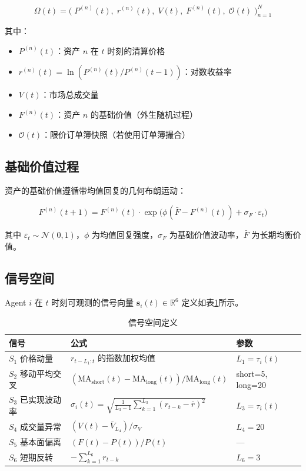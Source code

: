 \begin{equation}
\boxed{\Omega(t) = \bigl( \; P^{(n)}(t),\; r^{(n)}(t),\; V(t),\; F^{(n)}(t),\; \mathcal{O}(t) \;\bigr)_{n=1}^{N}}
\label{eq:market_state}
\end{equation}

其中：
\begin{itemize}
    \item $P^{(n)}(t)$：资产 $n$ 在 $t$ 时刻的清算价格
    \item $r^{(n)}(t) = \ln(P^{(n)}(t)/P^{(n)}(t-1))$：对数收益率
    \item $V(t)$：市场总成交量
    \item $F^{(n)}(t)$：资产 $n$ 的基础价值（外生随机过程）
    \item $\mathcal{O}(t)$：限价订单簿快照（若使用订单簿撮合）
\end{itemize}

\subsection{基础价值过程}

资产的基础价值遵循带均值回复的几何布朗运动：

\begin{equation}
F^{(n)}(t+1) = F^{(n)}(t) \cdot \exp\bigl( \phi(\bar{F} - F^{(n)}(t)) + \sigma_F \cdot \varepsilon_t \bigr)
\label{eq:fundamental}
\end{equation}

其中 $\varepsilon_t \sim \mathcal{N}(0, 1)$，$\phi$ 为均值回复强度，$\sigma_F$ 为基础价值波动率，$\bar{F}$ 为长期均衡价值。

\subsection{信号空间}
\label{sec:signal_space}

Agent $i$ 在 $t$ 时刻可观测的信号向量 $\mathbf{s}_i(t) \in \mathbb{R}^6$ 定义如表\ref{tab:signals}所示。

\begin{table}[htb]
\centering
\caption{信号空间定义}
\label{tab:signals}
\begin{tabular}{@{}lll@{}}
\toprule
信号 & 公式 & 参数 \\
\midrule
$S_1$ 价格动量 & $r_{t-L_1:t}$ 的指数加权均值 & $L_1 = \tau_i(t)$ \\
$S_2$ 移动平均交叉 & $(\text{MA}_{\text{short}}(t) - \text{MA}_{\text{long}}(t)) / \text{MA}_{\text{long}}(t)$ & short=5, long=20 \\
$S_3$ 已实现波动率 & $\sigma_i(t) = \sqrt{\frac{1}{L_3-1}\sum_{k=1}^{L_3}(r_{t-k} - \bar{r})^2}$ & $L_3 = \tau_i(t)$ \\
$S_4$ 成交量异常 & $(V(t) - \bar{V}_{L_4}) / \sigma_V$ & $L_4 = 20$ \\
$S_5$ 基本面偏离 & $(F(t) - P(t)) / P(t)$ & — \\
$S_6$ 短期反转 & $-\sum_{k=1}^{L_6} r_{t-k}$ & $L_6 = 3$ \\
\bottomrule
\end{tabular}
\end{table}

